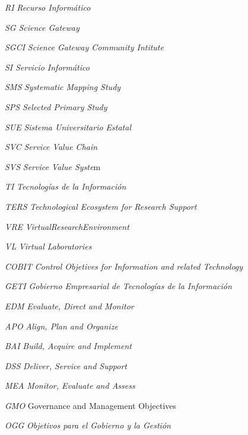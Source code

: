     {\textit{RI}}
    {\textit{Recurso Informático}}

    {\textit{SG}}
    {\textit{Science Gateway}}

    {\textit{SGCI}}
    {\textit{Science Gateway Community Intitute}}

    {\textit{SI}}
    {\textit{Servicio Informático}}

    {\textit{SMS}}
    {\textit{Systematic Mapping Study}}

    {\textit{SPS}}
    {\textit{Selected Primary Study}}

    {\textit{SUE}}
    {\textit{Sistema Universitario Estatal}}

    {\textit{SVC}}
    {\textit{Service Value Chain}}

    {\textit{SVS}}
    {\textit{Service Value Syste}m}

    {\textit{TI}}
    {\textit{Tecnologías de la Información}}

    {\textit{TERS}}
    {\textit{Technological Ecosystem for Research Support}}

    {\textit{VRE}}
    {\textit{\gls{VirtualResearchEnvironment}}}

    {\textit{VL}}
    {\textit{Virtual Laboratories}}



    {\textit{COBIT}}
    {\textit{Control Objetives for Information and related Technology}}

    {\textit{GETI}}
    {\textit{Gobierno Empresarial de Tecnologías de la Información}}

    {\textit{EDM}}
    {\textit{Evaluate, Direct and Monitor}} %

    {\textit{APO}}
    {\textit{Align, Plan and Organize}} %

    {\textit{BAI}}
    {\textit{Build, Acquire and Implement}} %

    {\textit{DSS}}
    {\textit{Deliver, Service and Support}} %

    {\textit{MEA}}
    {\textit{Monitor, Evaluate and Assess}} %

    {\textit{GMO}}
    {Governance and Management Objectives} %

    {\textit{OGG}}
    {\textit{Objetivos para el Gobierno y la Gestión}} %

